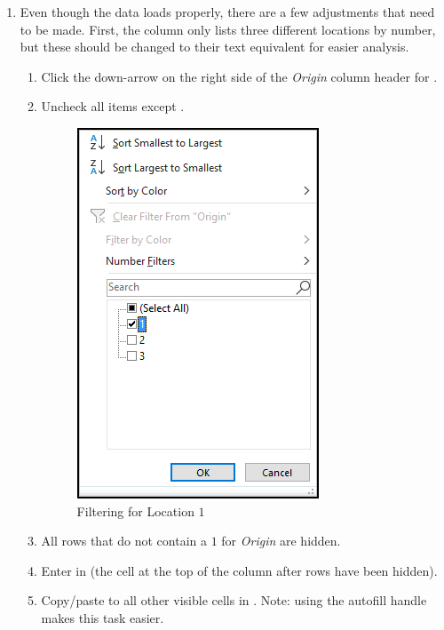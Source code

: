 \begin{enumerate}[resume]

	\item Even though the data loads properly, there are a few adjustments that need to be made. First, the  column only lists three different locations by number, but these should be changed to their text equivalent for easier analysis.
	
	\begin{enumerate}
		\item Click the down-arrow on the right side of the \textit{Origin} column header for .
		\item Uncheck all items except .

		\begin{figure}[H]
			\centering
			\includegraphics[width=\maxwidth{.95\linewidth}]{gfx/ch09_fig70}
			\caption{Filtering for Location $ 1 $}
			\label{09:fig70}
		\end{figure}

		\item All rows that do not contain a $ 1 $ for \textit{Origin} are hidden. 
		\item Enter  in  (the cell at the top of the column after rows have been hidden).
		\item Copy/paste  to all other visible cells in .	Note: using the autofill handle makes this task easier.
		

\end{enumerate}
\end{enumerate}
